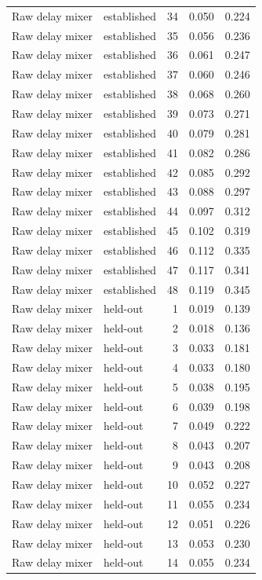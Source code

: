\begin{tabular}{llrrr}
Raw delay mixer & established & 34 & 0.050 & 0.224 \\
Raw delay mixer & established & 35 & 0.056 & 0.236 \\
Raw delay mixer & established & 36 & 0.061 & 0.247 \\
Raw delay mixer & established & 37 & 0.060 & 0.246 \\
Raw delay mixer & established & 38 & 0.068 & 0.260 \\
Raw delay mixer & established & 39 & 0.073 & 0.271 \\
Raw delay mixer & established & 40 & 0.079 & 0.281 \\
Raw delay mixer & established & 41 & 0.082 & 0.286 \\
Raw delay mixer & established & 42 & 0.085 & 0.292 \\
Raw delay mixer & established & 43 & 0.088 & 0.297 \\
Raw delay mixer & established & 44 & 0.097 & 0.312 \\
Raw delay mixer & established & 45 & 0.102 & 0.319 \\
Raw delay mixer & established & 46 & 0.112 & 0.335 \\
Raw delay mixer & established & 47 & 0.117 & 0.341 \\
Raw delay mixer & established & 48 & 0.119 & 0.345 \\
Raw delay mixer & held-out & 1 & 0.019 & 0.139 \\
Raw delay mixer & held-out & 2 & 0.018 & 0.136 \\
Raw delay mixer & held-out & 3 & 0.033 & 0.181 \\
Raw delay mixer & held-out & 4 & 0.033 & 0.180 \\
Raw delay mixer & held-out & 5 & 0.038 & 0.195 \\
Raw delay mixer & held-out & 6 & 0.039 & 0.198 \\
Raw delay mixer & held-out & 7 & 0.049 & 0.222 \\
Raw delay mixer & held-out & 8 & 0.043 & 0.207 \\
Raw delay mixer & held-out & 9 & 0.043 & 0.208 \\
Raw delay mixer & held-out & 10 & 0.052 & 0.227 \\
Raw delay mixer & held-out & 11 & 0.055 & 0.234 \\
Raw delay mixer & held-out & 12 & 0.051 & 0.226 \\
Raw delay mixer & held-out & 13 & 0.053 & 0.230 \\
Raw delay mixer & held-out & 14 & 0.055 & 0.234 \\

\end{tabular}
